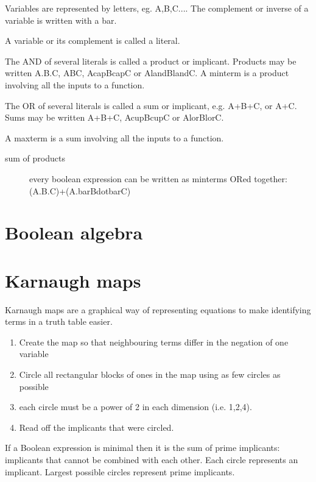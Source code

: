 Variables are represented by letters, eg. A,B,C.... The complement or inverse of a variable is written with a bar. 

A variable or its complement is called a literal. 

The AND of several literals is called a product or implicant. Products may be written A.B.C, ABC,  AcapBcapC or AlandBlandC. A minterm is a product involving all the inputs to a function.

The OR of several literals is called a sum or implicant, e.g. A+B+C, or A+C. Sums may be written A+B+C, AcupBcupC or AlorBlorC.

A maxterm is a sum involving all the inputs to a function.

\begin{description}
    \item[sum of products] every boolean expression can be written as minterms ORed together: (A.B.C)+(A.barBdotbarC)
\end{description}


\section{Boolean algebra}


\section{Karnaugh maps}

Karnaugh maps are a graphical way of representing equations to make identifying terms in a truth table easier.

\begin{enumerate}
    \item Create the map so that neighbouring terms differ in the negation of one variable
    \item Circle all rectangular blocks of ones in the map using as few circles as possible
    \item each circle must be a power of 2 in each dimension (i.e. 1,2,4).
    \item Read off the implicants that were circled.
\end{enumerate}

If a Boolean expression is minimal then it is the sum of prime implicants: implicants that cannot be combined with each other. Each circle represents an implicant. Largest possible circles represent prime implicants.

